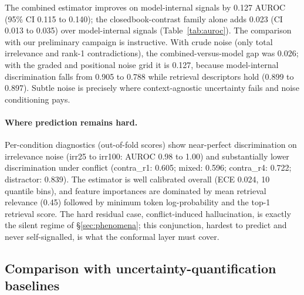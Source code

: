 \documentclass[sn-basic]{sn-jnl}
\theoremstyle{thmstyleone}
\theoremstyle{thmstyletwo}
\begin{document}
The combined estimator improves on model-internal signals by 0.127
AUROC (95\% CI 0.115 to 0.140); the closedbook-contrast family alone
adds 0.023 (CI 0.013 to 0.035) over model-internal signals
(Table~\ref{tab:auroc}). The comparison with our preliminary campaign
is instructive. With crude noise (only total irrelevance and rank-1
contradictions), the combined-versus-model gap was 0.026; with the
graded and positional noise grid it is 0.127, because model-internal
discrimination falls from 0.905 to 0.788 while retrieval descriptors
hold (0.899 to 0.897). Subtle noise is precisely where context-agnostic
uncertainty fails and noise conditioning pays.

\paragraph{Where prediction remains hard.}
Per-condition diagnostics (out-of-fold scores) show near-perfect
discrimination on irrelevance noise (irr25 to irr100: AUROC 0.98 to
1.00) and substantially lower discrimination under conflict
(contra\_r1: 0.605; mixed: 0.596; contra\_r4: 0.722; distractor:
0.839). The estimator is well calibrated overall (ECE 0.024, 10
quantile bins), and feature importances are dominated by mean retrieval
relevance (0.45) followed by minimum token log-probability and the
top-1 retrieval score. The hard residual case, conflict-induced
hallucination, is exactly the silent regime of
\S\ref{sec:phenomena}; this conjunction, hardest to predict and never
self-signalled, is what the conformal layer must cover.

\subsection{Comparison with uncertainty-quantification baselines}
\label{sec:baselines}
\end{document}
